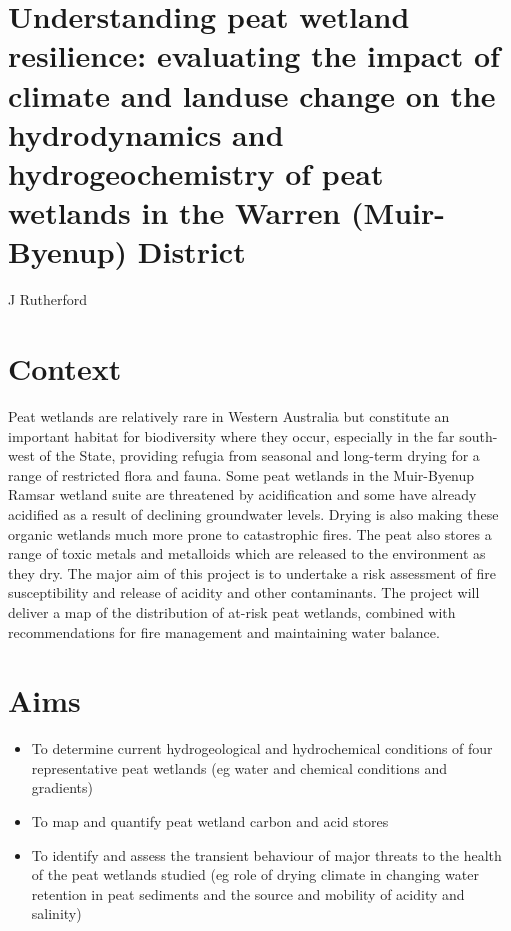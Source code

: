 \documentclass[version=last,
    paper=a4, %
    10pt, %
    usenames,
    dvipsnames,
    oneside, %
    headings=openany, %
    DIV=15 %
]{scrbook}
\begin{document}
\section*{Understanding peat wetland resilience: evaluating the impact of climate
and landuse change on the hydrodynamics and hydrogeochemistry of peat
wetlands in the Warren (Muir-Byenup) District
}

J Rutherford


\section*{Context}
Peat wetlands are relatively rare in Western Australia but constitute an
important habitat for biodiversity where they occur, especially in the
far south-west of the State, providing refugia from seasonal and
long-term drying for a range of restricted flora and fauna. Some peat
wetlands in the Muir-Byenup Ramsar wetland suite are threatened by
acidification and some have already acidified as a result of declining
groundwater levels. Drying is also making these organic wetlands much
more prone to catastrophic fires. The peat also stores a range of toxic
metals and metalloids which are released to the environment as they dry.
The major aim of this project is to undertake a risk assessment of fire
susceptibility and release of acidity and other contaminants. The
project will deliver a map of the distribution of at-risk peat wetlands,
combined with recommendations for fire management and maintaining water
balance.



\section*{Aims}
\begin{itemize}
\itemsep1pt\parskip0pt
\item
  To determine current hydrogeological and hydrochemical conditions of
  four representative peat wetlands (eg water and chemical conditions
  and gradients)
\item
  To map and quantify peat wetland carbon and acid stores
\item
  To identify and assess the transient behaviour of major threats to the
  health of the peat wetlands studied (eg role of drying climate in
  changing water retention in peat sediments and the source and mobility
  of acidity and salinity)
\end{itemize}
\end{document}
